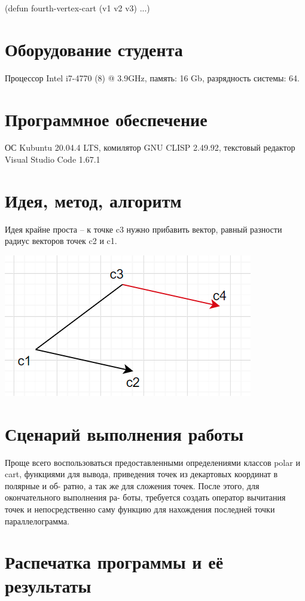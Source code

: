 \documentclass[12pt]{article}
\begin{document}
(defun fourth-vertex-cart (v1 v2 v3)
  ...)

\section{Оборудование студента}
Процессор Intel i7-4770 (8) @ 3.9GHz, память: 16 Gb, разрядность системы: 64.

\section{Программное обеспечение}
ОС Kubuntu 20.04.4 LTS, комилятор GNU CLISP 2.49.92, текстовый редактор Visual Studio Code 1.67.1

\pagebreak
\section{Идея, метод, алгоритм}
Идея крайне проста – к точке c3 нужно прибавить вектор, равный разности радиус
векторов точек c2 и c1.

\includegraphics[scale=0.8]{./ris1.png}

\section{Сценарий выполнения работы}
Проще всего воспользоваться предоставленными определениями классов polar и cart,
функциями для вывода, приведения точек из декартовых координат в полярные и об-
ратно, а так же для сложения точек. После этого, для окончательного выполнения ра-
боты, требуется создать оператор вычитания точек и непосредственно саму функцию
для нахождения последней точки параллелограмма.

\section{Распечатка программы и её результаты}
\end{document}
